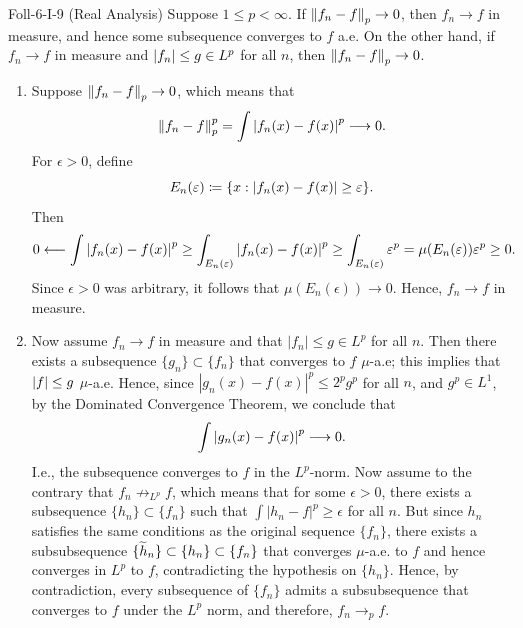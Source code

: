\documentclass{article}
\begin{document}
\begin{prb}{Foll-6-I-9 (Real Analysis)}
	Suppose $1 \leq p < \infty$. If $\left\Vert f_{n} - f \right\Vert_{p} \to 0$, then $f_{n} \to f$ in measure, and hence some subsequence converges to $f$ a.e. On the other hand, if $f_{n} \to f$ in measure and $\left| f_{n} \right| \leq g \in L^{p}$ for all $n$, then $\left\Vert f_{n} - f \right\Vert_{p} \to 0$. 
\end{prb}
\begin{solutions}
	\vspace{-0.35cm}
	\begin{enumerate}[itemsep =-2pt,label = (\roman{*})]
		\item Suppose $\left\Vert f_{n} - f \right\Vert_{p} \to 0$, which means that 
			\begin{equation}
				\left\Vert f_{n} - f \right\Vert_{p}^{p} = \int \left| f_{n}(x) - f(x) \right|^{p} \longrightarrow 0. 
			\end{equation}
		For $\epsilon > 0$, define 
			\begin{equation}
				E_{n}(\epsilon) \coloneqq \brac*{x: \abs{f_{n}(x) - f(x)} \geq \epsilon}. 
			\end{equation}
		Then 
			\begin{equation}
				0 \longleftarrow \int \left| f_{n}(x) - f(x) \right|^{p} \geq \int_{E_{n}(\varepsilon)}\left| f_{n}(x) - f(x) \right|^{p} \geq \int_{E_{n}(\varepsilon)}\varepsilon^{p} = \mu(E_{n}(\varepsilon))\varepsilon^{p} \geq 0. 
			\end{equation}
		Since $\epsilon > 0$ was arbitrary, it follows that $\mu(E_{n}(\epsilon)) \to 0$. Hence, $f_{n} \to f$ in measure. 
		\item Now assume $f_{n} \to f$ in measure and that $|f_{n}| \leq g \in L^{p}$ for all $n$. Then there exists a subsequence $\{g_{n}\} \subset \{f_{n}\}$ that converges to $f$ $\mu$-a.e; this implies that $\left| f \right| \leq g$ $\mu$-a.e. Hence, since $|g_{n}(x) - f(x)|^{p} \leq 2^{p}g^{p}$ for all $n$, and $g^{p} \in L^{1}$, by the Dominated Convergence Theorem, we conclude that 
			\begin{equation}
				\int \left| g_{n}(x) - f(x) \right|^{p} \longrightarrow 0. 
			\end{equation}
		I.e., the subsequence converges to $f$ in the $L^{p}$-norm. Now assume to the contrary that $f_{n} \mathop{\not\longrightarrow}_{L^{p}} f$, which means that for some $\epsilon > 0$, there exists a subsequence $\{h_{n}\} \subset \{f_{n}\}$ such that $\int |h_{n} - f|^{p} \geq \epsilon$ for all $n$. But since $h_{n}$ satisfies the same conditions as the original sequence $\{f_{n}\}$, there exists a subsubsequence $\{\widetilde{h}_{n}\} \subset \{h_{n}\} \subset \{f_{n}\}$ that converges $\mu$-a.e. to $f$ and hence converges in $L^{p}$ to $f$, contradicting the hypothesis on $\{h_{n}\}$. Hence, by contradiction, every subsequence of $\{f_{n}\}$ admits a subsubsequence that converges to $f$ under the $L^{p}$ norm, and therefore, $f_{n} \mathop{\longrightarrow}_{p} f$. 
	\end{enumerate}
\end{solutions}
\end{document}
